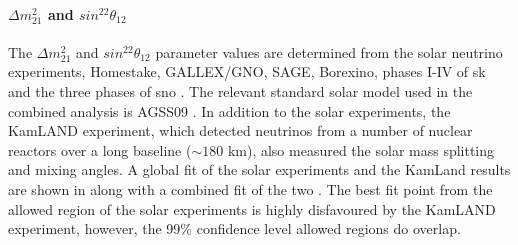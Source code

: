 \paragraph{$\Delta m^2_{21}$ and $sin^22\theta_{12}$}
The $\Delta m^2_{21}$ and $sin^22\theta_{12}$ parameter values are determined from the solar neutrino experiments, Homestake, GALLEX/GNO, SAGE, Borexino, phases I-IV of \gls{sk} and the three phases of \gls{sno} \cite{Gallex_reanalysis}\cite{Measurement_of_the_Solar_Electron_Neutrino_Flux_with_the_Homestake_Chlorine_Detector}\cite{Measurement_of_the_solar_neutrino_capture_rate_with_gallium_metal}\cite{Precision_measurement_of_the_7Be_solar_neutrino_interaction_rate_in_Borexino}\cite{Final_results_of_Borexino_PhaseI_on_low_energy_solar_neutrino_spectroscopy} \cite{Solar_neutrino_measurements_in_Super-Kamiokande-I}\cite{Solar_neutrino_measurements_in_Super-Kamiokande-II}\cite{Solar_neutrino_results_in_Super-Kamiokande-III}\cite{8B_solar_neutrino_spectrum_measurement_using_Super-Kamiokande_IV}\cite{Combined_Analysis_of_all_Three_Phases_of_Solar_Neutrino_Data_from_the_Sudbury_Neutrino_Observatory}. The relevant standard solar model used in the combined analysis is AGSS09 \cite{AGSS09}. In addition to the solar experiments, the KamLAND experiment, which detected neutrinos from a number of nuclear reactors over a long baseline ($\sim180$ km), also measured the solar mass splitting and mixing angles. \cite{Precision_Measurement_of_Neutrino_Oscillation_Parameters_with_KamLAND}\cite{Constraints_on_theta13_from_A_Three_Flavor_Oscillation_Analysis_of_Reactor_Antineutrinos_at_KamLAND}\cite{Reactor_On-Off_Antineutrino_Measurement_with_KamLAND} A global fit of the solar experiments and the KamLand results are shown in  along with a combined fit of the two \cite{2020_global_reassessment_of_the_neutrino_oscillation_picture}. The best fit point from the allowed region of the solar experiments is highly disfavoured by the KamLAND experiment, however, the 99\% confidence level allowed regions do overlap. 


